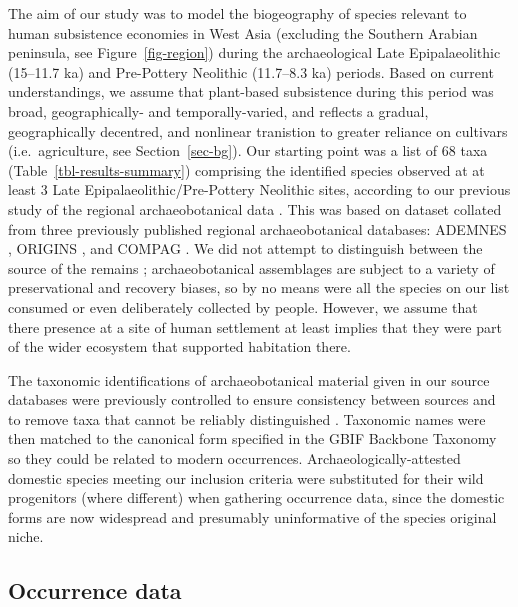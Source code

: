 \documentclass[
  authoryear,
  preprint]{elsarticle}
\begin{document}
The aim of our study was to model the biogeography of species relevant
to human subsistence economies in West Asia (excluding the Southern
Arabian peninsula, see Figure~\ref{fig-region}) during the
archaeological Late Epipalaeolithic (15--11.7 ka) and Pre-Pottery
Neolithic (11.7--8.3 ka) periods. Based on current understandings, we
assume that plant-based subsistence during this period was broad,
geographically- and temporally-varied, and reflects a gradual,
geographically decentred, and nonlinear tranistion to greater reliance
on cultivars (i.e.~agriculture, see Section~\ref{sec-bg}). Our starting
point was a list of 68 taxa (Table~\ref{tbl-results-summary}) comprising
the identified species observed at at least 3 Late
Epipalaeolithic/Pre-Pottery Neolithic sites, according to our previous
study of the regional archaeobotanical data
\citep{ArranzOtaeguiRoe2023}. This was based on dataset collated from
three previously published regional archaeobotanical databases: ADEMNES
\citep{ADEMNES}, ORIGINS \citep{ORIGINS}, and COMPAG
\citetext{\citealp{LucasFuller2018}; \citealp{FullerEtAl2018}; \citealp[based
on][]{ColledgeEtAl2004}; \citealp{ShennanConolly2007}}. We did not
attempt to distinguish between the source of the remains
\citep[cf.][]{WallaceEtAl2018}; archaeobotanical assemblages are subject
to a variety of preservational and recovery biases, so by no means were
all the species on our list consumed or even deliberately collected by
people. However, we assume that there presence at a site of human
settlement at least implies that they were part of the wider ecosystem
that supported habitation there.

The taxonomic identifications of archaeobotanical material given in our
source databases were previously controlled to ensure consistency
between sources and to remove taxa that cannot be reliably distinguished
\citep[for details see][]{ArranzOtaeguiRoe2023}. Taxonomic names were
then matched to the canonical form specified in the GBIF Backbone
Taxonomy \citep{GBIFSecretariat2023} so they could be related to modern
occurrences. Archaeologically-attested domestic species meeting our
inclusion criteria were substituted for their wild progenitors (where
different) when gathering occurrence data, since the domestic forms are
now widespread and presumably uninformative of the species original
niche.

\subsection{Occurrence data}\label{sec-occ-data}
\end{document}
